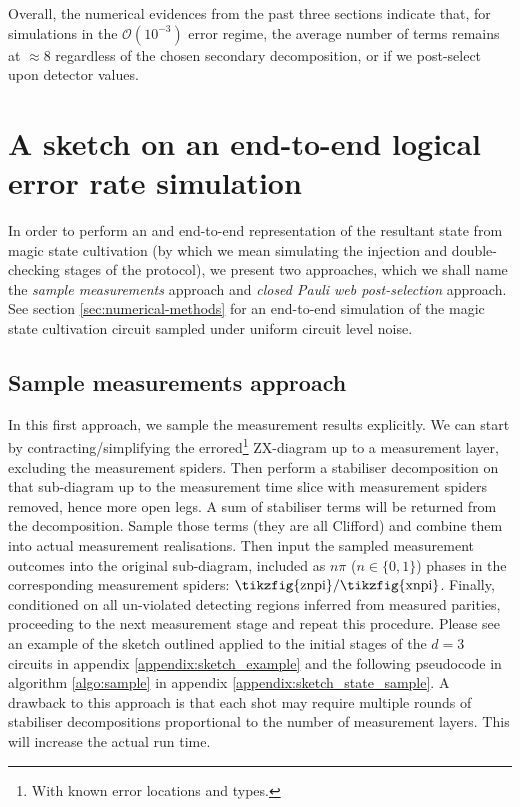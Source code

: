 \documentclass[a4paper,onecolumn,11pt,accepted=2026-06-10]{quantumarticle}
\begin{document}
Overall, the numerical evidences from the past three sections indicate that, for simulations in the $\mathcal{O}(10^{-3})$ error regime, the average number of terms remains at $\approx 8$ regardless of the chosen secondary decomposition, or if we post-select upon detector values.

\section{A sketch on an end-to-end logical error rate simulation}

In order to perform an and end-to-end representation of the resultant state from magic state cultivation (by which we mean simulating the injection and double-checking stages of the protocol), we present two approaches, which we shall name the \textit{sample measurements} approach and \textit{closed Pauli web post-selection} approach. See section \ref{sec:numerical-methods} for an end-to-end simulation of the magic state cultivation circuit sampled under uniform circuit level noise.

\subsection{Sample measurements approach}
In this first approach, we sample the measurement results explicitly. We can start by contracting/simplifying the errored\footnote{With known error locations and types.} ZX-diagram up to a measurement layer, excluding the measurement spiders. Then perform a stabiliser decomposition on that sub-diagram up to the measurement time slice with measurement spiders removed, hence more open legs. A sum of stabiliser terms will be returned from the decomposition. Sample those terms (they are all Clifford) and combine them into actual measurement realisations. Then input the sampled measurement outcomes into the original sub-diagram, included as $n\pi$ ($n\in \{0,1\}$) phases in the corresponding measurement spiders: $\scalebox{1}{\tikzfig{znpi}}/\scalebox{1}{\tikzfig{xnpi}}$. Finally, conditioned on all un-violated detecting regions inferred from measured parities, proceeding to the next measurement stage and repeat this procedure. Please see an example of the sketch outlined applied to the initial stages of the $d=3$ circuits in appendix \ref{appendix:sketch_example} and the following pseudocode in algorithm \ref{algo:sample} in appendix \ref{appendix:sketch_state_sample}. A drawback to this approach is that each shot may require multiple rounds of stabiliser decompositions proportional to the number of measurement layers. This will increase the actual run time.
\end{document}
